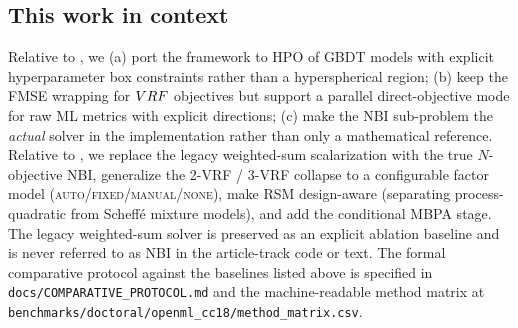 \subsection{This work in context}\label{sec:rw-positioning}
Relative to \citep{pereira2025eaai}, we (a) port the framework to HPO
of GBDT models with explicit hyperparameter box constraints rather
than a hyperspherical region; (b) keep the FMSE wrapping for $VRF$
objectives but support a parallel direct-objective mode for raw ML
metrics with explicit directions; (c) make the NBI sub-problem the
\emph{actual} solver in the implementation rather than only a
mathematical reference. Relative to
\citep{ribeiro2026dissertation}, we replace the legacy weighted-sum
scalarization with the true $N$-objective NBI, generalize the
2-VRF / 3-VRF collapse to a configurable factor model
(\textsc{auto}/\textsc{fixed}/\textsc{manual}/\textsc{none}), make
RSM design-aware (separating process-quadratic from Scheff\'{e}
mixture models), and add the conditional MBPA stage. The legacy
weighted-sum solver is preserved as an explicit ablation baseline and
is never referred to as NBI in the article-track code or text. The
formal comparative protocol against the baselines listed above is
specified in \texttt{docs/COMPARATIVE\_PROTOCOL.md} and the
machine-readable method matrix at
\texttt{benchmarks/doctoral/openml\_cc18/method\_matrix.csv}.
